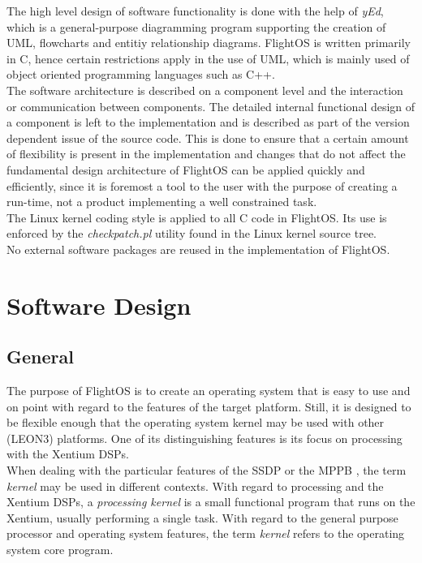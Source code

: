 The high level design of software functionality is done with the help of
\emph{yEd}, which is a general-purpose diagramming program supporting the
creation of UML, flowcharts and entitiy relationship diagrams.
FlightOS is written primarily in C, hence certain restrictions apply in the use of
UML, which is mainly used of object oriented programming languages such as C++.
\\

The software architecture is described on a component level and the interaction
or communication between components. The detailed internal functional design of
a component is left to the implementation and is described as part of the
version dependent issue of the source code. This is done to ensure that a
certain amount of flexibility is present in the implementation and changes that
do not affect the fundamental design architecture of FlightOS can be applied
quickly and efficiently, since it is foremost a tool to the user with the
purpose of creating a run-time, not a product implementing a well constrained
task.\\

The Linux kernel coding style is applied to all C code in FlightOS. Its use is
enforced by the \emph{checkpatch.pl} utility found in the Linux kernel source
tree.\\

No external software packages are reused in the implementation of FlightOS.


\chapter{Software Design}


\section{General}


The purpose of FlightOS is to create an operating system that is easy to use and on
point with regard to the features of the target platform. Still, it is designed
to be flexible enough that the operating system kernel may be used with other
(\gls{LEON3}) platforms. One of its distinguishing features is its focus on
processing with the \gls{Xentium} \glspl{DSP}.\\

\noindent
When dealing with the particular features of the \gls{SSDP} or the \gls{MPPB}
\cite{MPPB}, the term \emph{kernel} may be used in different contexts.
With regard to processing and the \gls{Xentium} \glspl{DSP}, a
\emph{processing kernel} is a small functional program that runs on the
\gls{Xentium}, usually performing a single task. With regard to the general
purpose processor and operating system features, the term \emph{kernel} refers
to the operating system core program. \\

